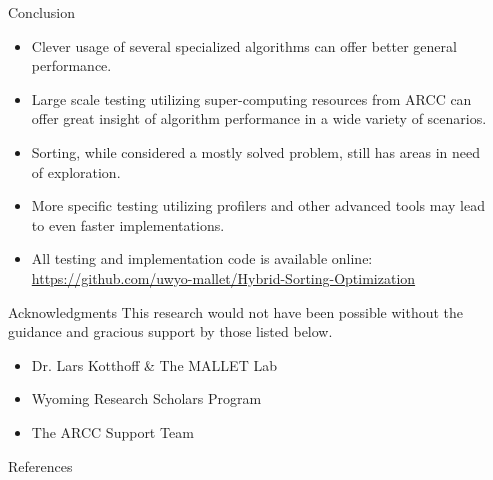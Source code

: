 \documentclass[final]{beamer}
\newlength{\sepwidth}
\newlength{\colwidth}
\newcommand{\separatorcolumn}{\begin{column}{\sepwidth}\end{column}}
\begin{document}
\begin{frame}[t]
\begin{columns}[t]
\begin{column}{\colwidth}
			\begin{block}{Conclusion}
				\begin{itemize}
					\item Clever usage of several specialized algorithms can offer better
					      general performance.
					\item Large scale testing utilizing super-computing resources from
					      ARCC can offer great insight of algorithm performance in a wide
					      variety of scenarios\parencite{ARCC}.
					\item Sorting, while considered a mostly solved problem, still has
					      areas in need of exploration.
					\item More specific testing utilizing profilers and other advanced
					      tools may lead to even faster implementations.
					\item All testing and implementation code is available online:
					      \href{https://github.com/uwyo-mallet/Hybrid-Sorting-Optimization}{https://github.com/uwyo-mallet/Hybrid-Sorting-Optimization}
				\end{itemize}
			\end{block}

			\begin{block}{Acknowledgments}
				This research would not have been possible without the guidance and
				gracious support by those listed below.
				\vspace{-5mm}
				\begin{itemize}
					\item Dr. Lars Kotthoff \& The MALLET Lab
					\item Wyoming Research Scholars Program
					\item The ARCC Support Team
				\end{itemize}
			\end{block}

			\vspace{10mm}
			\nocite{ARCC}
			\begin{block}{References}
				\printbibliography
			\end{block}
		\end{column}

		\separatorcolumn
	\end{columns}
\end{frame}
\end{document}

